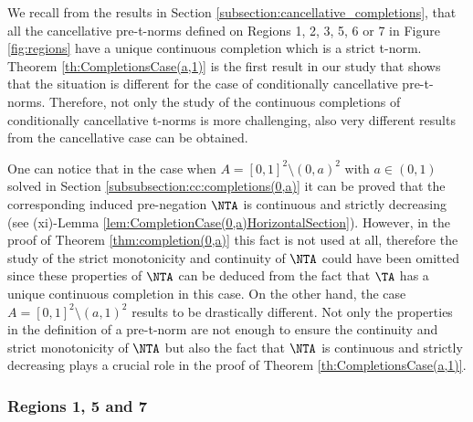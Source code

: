 \begin{remark}
	We recall from the results in Section \ref{subsection:cancellative_completions}, that all the cancellative pre-t-norms defined on Regions 1, 2, 3, 5, 6 or 7 in Figure \ref{fig:regions} have a unique continuous completion which is a strict t-norm. Theorem \ref{th:CompletionsCase(a,1)} is the first result in our study that shows that the situation is different for the case of conditionally cancellative pre-t-norms. Therefore, not only the study of the continuous completions of conditionally cancellative t-norms is more challenging,  also very different results from the cancellative case can be obtained.
\end{remark}

\begin{remark} One can notice that in the case when $A=[0,1]^2 \setminus (0,a)^2$ with $a \in (0,1)$ solved in Section \ref{subsubsection:cc:completions(0,a)} it can be proved that the corresponding induced pre-negation $\NTA$ is continuous and strictly decreasing (see (xi)-Lemma \ref{lem:CompletionCase(0,a)HorizontalSection}). However, in the proof of Theorem \ref{thm:completion(0,a)} this fact is not used at all, therefore the study of the strict monotonicity and continuity of $\NTA$ could have been omitted since these properties of $\NTA$ can be deduced from the fact that $\TA$ has a unique continuous completion in this case. On the other hand, the case $A=[0,1]^2 \setminus (a,1)^2$ results to be drastically different. Not only the properties in the definition of a pre-t-norm are not enough to ensure the continuity and strict monotonicity of $\NTA$ but also the fact that $\NTA$ is continuous and strictly decreasing plays a crucial role in the proof of Theorem \ref{th:CompletionsCase(a,1)}.
\end{remark}

\subsubsection{Regions 1, 5 and 7}

